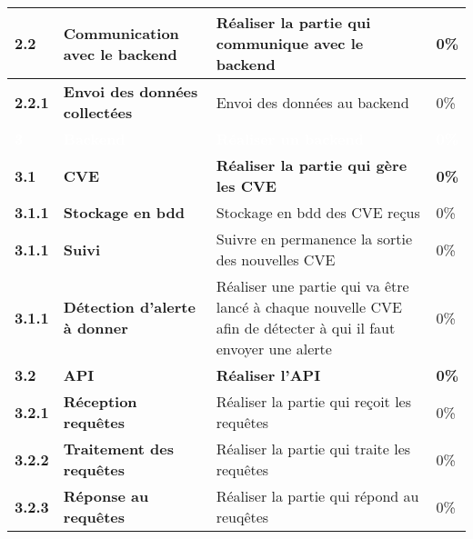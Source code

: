 \begin{supertabular}{|p{1.5cm} p{6cm}|p{5cm}|R{2cm}|}
  \textbf{2.2}  & \textbf{Communication avec le backend} & \textbf{Réaliser la partie qui communique avec le backend} & \textbf{0\%} \\
  \hline

  \hspace{6pt}
  \textbf{2.2.1}  & \textbf{Envoi des données collectées} & Envoi des données au backend & 0\% \\
  \hline


  \textcolor{white}{\textbf{3}}  & \textcolor{white}{\textbf{Backend}} & \textcolor{white}{\textbf{Réaliser un backend}} & \textcolor{white}{\textbf{0\%}} \\
  \hline

  \textbf{3.1}  & \textbf{CVE} & \textbf{Réaliser la partie qui gère les CVE} & \textbf{0\%} \\
  \hline

  \hspace{6pt}
  \textbf{3.1.1}  & \textbf{Stockage en bdd} & Stockage en bdd des CVE reçus & 0\% \\
  \hline

  \hspace{6pt}
  \textbf{3.1.1}  & \textbf{Suivi} & Suivre en permanence la sortie des nouvelles CVE  & 0\% \\
  \hline

  \hspace{6pt}
  \textbf{3.1.1}  & \textbf{Détection d'alerte à donner} & Réaliser une partie qui va être lancé à chaque nouvelle CVE afin de détecter à qui il faut envoyer une alerte & 0\% \\
  \hline


  \textbf{3.2}  & \textbf{API} & \textbf{Réaliser l'API} & \textbf{0\%} \\
  \hline

  \hspace{6pt}
  \textbf{3.2.1}  & \textbf{Réception requêtes} & Réaliser la partie qui reçoit les requêtes & 0\% \\
  \hline

  \hspace{6pt}
  \textbf{3.2.2}  & \textbf{Traitement des requêtes} & Réaliser la partie qui traite les requêtes  & 0\% \\
  \hline

  \hspace{6pt}
  \textbf{3.2.3}  & \textbf{Réponse au requêtes} & Réaliser la partie qui répond au reuqêtes & 0\% \\
  \hline



\end{supertabular}
